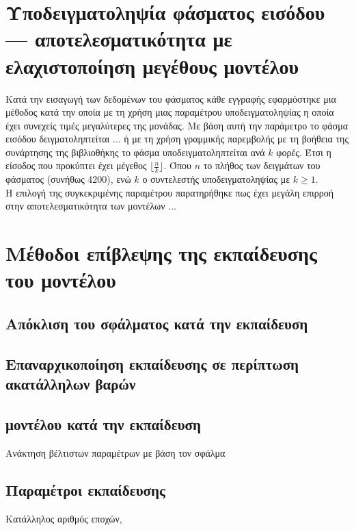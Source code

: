 \section{Υποδειγματοληψία φάσματος εισόδου --- αποτελεσματικότητα με ελαχιστοποίηση μεγέθους μοντέλου}
Κατά την εισαγωγή των δεδομένων του φάσματος κάθε εγγραφής εφαρμόστηκε μια μέθοδος κατά την οποία με τη χρήση μιας παραμέτρου υποδειγματοληψίας  η οποία έχει συνεχείς τιμές μεγαλύτερες της μονάδας. Με βάση αυτή την παράμετρο το φάσμα εισόδου δειγματοληπτείται ... ή με τη χρήση γραμμικής παρεμβολής με τη βοήθεια της συνάρτησης  της βιβλιοθήκης  το φάσμα υποδειγματοληπτείται ανά $k$ φορές. Έτσι η είσοδος που προκύπτει έχει μέγεθος $\lfloor\frac{n}{k}\rfloor$. Όπου $n$ το πλήθος των δειγμάτων του φάσματος (συνήθως 4200), ενώ $k$ ο συντελεστής υποδειγματοληψίας με $k\ge1$.\\
Η επιλογή της συγκεκριμένης παραμέτρου παρατηρήθηκε πως έχει μεγάλη επιρροή στην αποτελεσματικότητα των μοντέλων ...
\section{Μέθοδοι επίβλεψης της εκπαίδευσης του μοντέλου}

\subsection{Απόκλιση του σφάλματος  κατά την εκπαίδευση}

\subsection{Επαναρχικοποίηση εκπαίδευσης σε περίπτωση ακατάλληλων βαρών}

\subsection{ μοντέλου κατά την εκπαίδευση}
Ανάκτηση βέλτιστων παραμέτρων με βάση τον σφάλμα 

\subsection{Παραμέτροι εκπαίδευσης}
Κατάλληλος αριθμός εποχών, 

